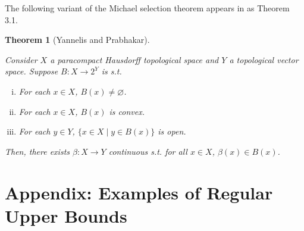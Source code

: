 \documentclass[aop,preprint]{imsart}
\numberwithin{equation}{section}
\theoremstyle{definition}
\theoremstyle{plain}
\newtheorem{theorem}{Theorem}[section]
\begin{document}
The following variant of the Michael selection theorem appears in \cite{Yannelis_1983} as Theorem 3.1.

\begin{samepage}
\begin{theorem} [Yannelis and Prabhakar]
\label{thm:selection}

Consider $X$ a paracompact Hausdorff topological space and $Y$ a topological vector space. Suppose $B: X \rightarrow 2^Y$ is s.t.

\begin{enumerate}[i.]

\item For each $x \in X$, $B\left(x\right) \ne \varnothing$.
\item For each $x \in X$, $B\left(x\right)$ is convex.
\item For each $y \in Y$, $\{x \in X \mid y \in B\left(x\right)\}$ is open.

\end{enumerate}

Then, there exists $\beta: X \rightarrow Y$ continuous s.t. for all $x \in X$, $\beta\left(x\right) \in B\left(x\right)$.

\end{theorem}
\end{samepage}

\section{Appendix: Examples of Regular Upper Bounds}
\label{sec:examples}
\end{document}
